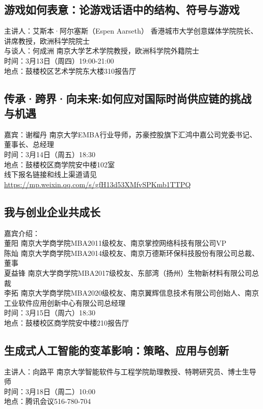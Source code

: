 \documentclass[letterpaper, 12pt]{article}
\begin{document}
\begin{multicols}{2}
\subsection{游戏如何表意：论游戏话语中的结构、符号与游戏}
主讲人：艾斯本·阿尔塞斯（Espen Aarseth） 香港城市大学创意媒体学院院长、讲席教授，欧洲科学院院士\\
与谈人：何成洲 南京大学艺术学院教授，欧洲科学院外籍院士\\
时间：3月13日（周四）19:00-21:00\\
地点：鼓楼校区艺术学院东大楼310报告厅\\

\subsection{传承·跨界·向未来:如何应对国际时尚供应链的挑战与机遇}
嘉宾：谢榴丹 南京大学EMBA行业导师，苏豪控股旗下汇鸿中嘉公司党委书记、董事长、总经理\\
时间：3月14日（周五）18:30\\
地点：鼓楼校区商学院安中楼102室\\
线下报名链接和线上渠道请见\url{https://mp.weixin.qq.com/s/gfH13d53XMfvSPKmb1TTPQ}

\subsection{我与创业企业共成长}
嘉宾介绍：\\
董阳 南京大学商学院MBA2011级校友、南京掌控网络科技有限公司VP\\
陈灿 南京大学商学院MBA2014级校友、南京万德斯环保科技股份有限公司总裁、董事\\
夏益锋 南京大学商学院MBA2017级校友、东部湾（扬州）生物新材料有限公司总裁\\
李拓 南京大学商学院MBA2020级校友、南京翼辉信息技术有限公司创始人、南京工业软件应用创新中心有限公司总经理\\
时间：3月15日（周六）18:30\\
地点：鼓楼校区商学院安中楼210报告厅\\

\subsection{生成式人工智能的变革影响：策略、应用与创新}
主讲人：向路平 南京大学智能软件与工程学院助理教授、特聘研究员、博士生导师\\
时间：3月18日（周二）10:00\\
地点：腾讯会议516-780-704\\


\end{multicols}
\end{document}
